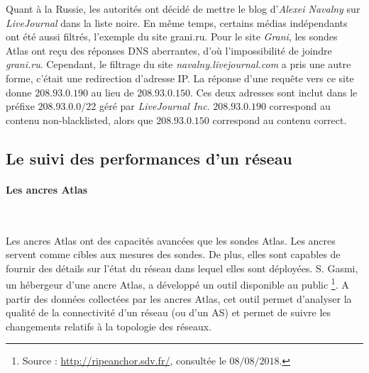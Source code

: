 Quant à la Russie, les autorités ont décidé de mettre le blog d'\textit{Alexei Navalny} sur  \textit{LiveJournal}  dans la liste noire. En même temps, certains médias indépendants ont été aussi filtrés, l'exemple du site grani.ru.  Pour le site  \textit{Grani}, les sondes Atlas ont reçu des réponses DNS aberrantes, d'où l'impossibilité de joindre   \textit{grani.ru}. Cependant, le filtrage du site \textit{navalny.livejournal.com}  a pris une autre forme, c'était une redirection d'adresse IP. La réponse d'une requête vers ce site donne $208.93.0.190$  au lieu de $ 208.93.0.150$. Ces deux adresses sont inclut dans le préfixe $208.93.0.0/22$ géré par \textit{LiveJournal Inc}. 
$208.93.0.190$  correspond au contenu  non-blacklisted, alors que  $ 208.93.0.150$ correspond au contenu correct.


\subsection{Le suivi des performances d'un réseau}


\paragraph{Les ancres  Atlas}~

Les ancres  Atlas ont des capacités avancées que les sondes  Atlas. Les ancres servent comme cibles aux mesures des sondes. De plus, elles sont capables de fournir des détails sur l'état du réseau dans lequel elles sont déployées.  S. Gasmi, un hébergeur d'une ancre  Atlas, a développé un outil  disponible au public \footnote{Source : \url{http://ripeanchor.sdv.fr/}, consultée le $08/08/2018$.}. 
A partir des données collectées par les ancres Atlas, cet outil permet d'analyser  la qualité de la connectivité d'un réseau (ou d'un AS) et permet de suivre les changements relatifs à la topologie des réseaux.

